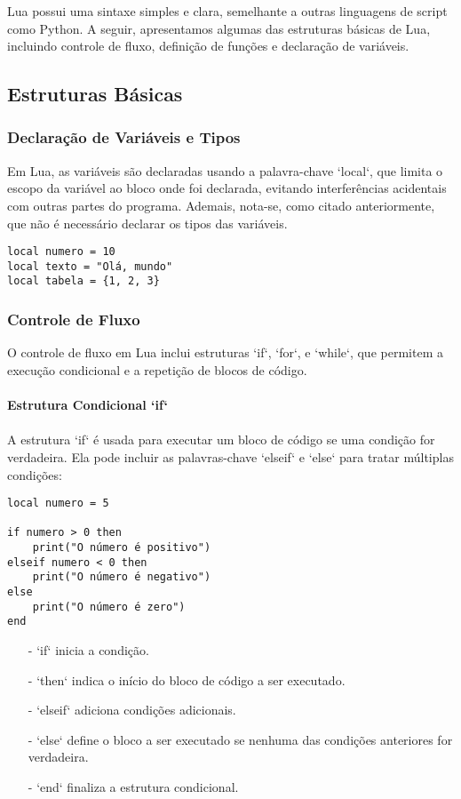 \documentclass[12pt]{article}
\begin{document}
Lua possui uma sintaxe simples e clara, semelhante a outras linguagens de script como Python. A seguir, apresentamos algumas das estruturas básicas de Lua, incluindo controle de fluxo, definição de funções e declaração de variáveis.

\subsection{Estruturas Básicas} 

\subsubsection{Declaração de Variáveis e Tipos} 

Em Lua, as variáveis são declaradas usando a palavra-chave `local`, que limita o escopo da variável ao bloco onde foi declarada, evitando interferências acidentais com outras partes do programa. Ademais, nota-se, como citado anteriormente, que não é necessário declarar os tipos das variáveis.

\begin{verbatim}
local numero = 10
local texto = "Olá, mundo"
local tabela = {1, 2, 3}
\end{verbatim}

\subsubsection{Controle de Fluxo}
O controle de fluxo em Lua inclui estruturas `if`, `for`, e `while`, que permitem a execução condicional e a repetição de blocos de código. 
\\\\
\noindent\textbf{Estrutura Condicional `if`}
\\\\
A estrutura `if` é usada para executar um bloco de código se uma condição for verdadeira. Ela pode incluir as palavras-chave `elseif` e `else` para tratar múltiplas condições:
\begin{verbatim}
local numero = 5

if numero > 0 then
    print("O número é positivo")
elseif numero < 0 then
    print("O número é negativo")
else
    print("O número é zero")
end
\end{verbatim}

\begin{itemize}
  \item[-] `if` inicia a condição.
  \item[-] `then` indica o início do bloco de código a ser executado.
  \item[-] `elseif` adiciona condições adicionais.
  \item[-] `else` define o bloco a ser executado se nenhuma das condições anteriores for verdadeira.
  \item[-] `end` finaliza a estrutura condicional.
\end{itemize}
\end{document}

